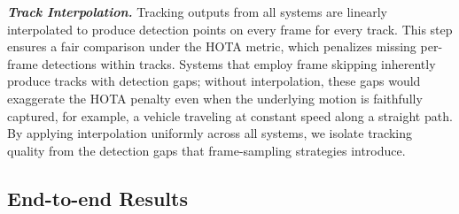 \textbf{\em Track Interpolation.}
Tracking outputs from all systems are linearly interpolated to produce detection points on every frame for every track.
This step ensures a fair comparison under the HOTA metric,
which penalizes missing per-frame detections within tracks.
Systems that employ frame skipping inherently produce tracks with detection gaps;
without interpolation,
these gaps would exaggerate the HOTA penalty even when the underlying motion is faithfully captured,
for example,
a vehicle traveling at constant speed along a straight path.
By applying interpolation uniformly across all systems,
we isolate tracking quality from the detection gaps that frame-sampling strategies introduce.

\subsection{End-to-end Results}
\label{sec:e2e-results}

